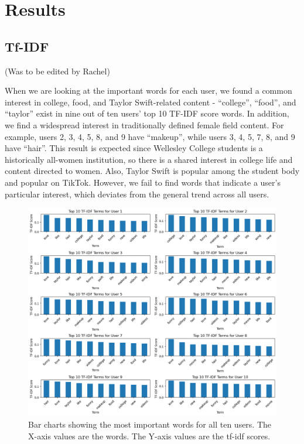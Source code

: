 \documentclass[acmtog]{acmart}
\begin{document}
\section{Results}
\subsection{Tf-IDF}
(Was to be edited by Rachel)

When we are looking at the important words for each user, we found a common interest in college, food, and Taylor Swift-related content - “college”,  “food”, and “taylor” exist in nine out of ten users’ top 10 TF-IDF score words. In addition, we find a widespread interest in traditionally defined female field content. For example, users 2, 3, 4, 5, 8, and 9 have “makeup”, while users 3, 4, 5, 7, 8, and 9 have “hair”. This result is expected since Wellesley College students is a historically all-women institution, so there is a shared interest in college life and content directed to women. Also, Taylor Swift is popular among the student body and popular on TikTok. However, we fail to find words that indicate a user’s particular interest, which deviates from the general trend across all users.

\begin{figure}[ht]
  \centering
  \includegraphics[width=\linewidth]{TFIDFold.png}
  \caption{Bar charts showing the most important words for all ten users. The X-axis values are the words. The Y-axis values are the tf-idf scores. 
  \label{fig:tf-idf}}
\end{figure}
\end{document}
